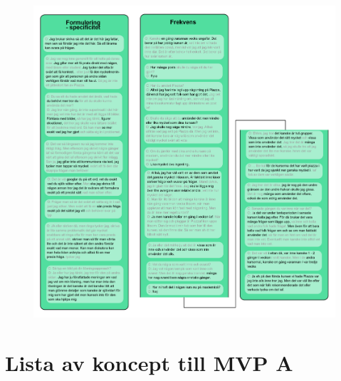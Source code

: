 \begin{figure}[hbtp]
    \centering
    \includegraphics[scale=0.8,angle=90]{appendix/appendix_green/part6b.png}
    \caption*{}
    \label{fig:nr8_part8}
\end{figure}

\newpage

\section{Lista av koncept till MVP A}
\label{app:koncept}

